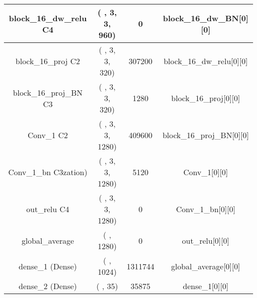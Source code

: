 \documentclass{bmvc2k}
\begin{document}
\begin{table}
\begin{tabular}{|c|c|c|c|}
block\_16\_dw\_relu C4  & ( , 3, 3, 960)  &  0      &     block\_16\_dw\_BN[0][0]      \\ \hline
block\_16\_proj C2       & ( , 3, 3, 320)  &  307200 &     block\_16\_dw\_relu[0][0]    \\ \hline
block\_16\_proj\_BN C3 & ( , 3, 3, 320)  &  1280   &     block\_16\_proj[0][0]           \\ \hline
Conv\_1 C2                 & ( , 3, 3, 1280) &  409600 &     block\_16\_proj\_BN[0][0]        \\ \hline
Conv\_1\_bn C3zation)  & ( , 3, 3, 1280) &  5120   &     Conv\_1[0][0]                     \\ \hline
out\_relu C4                 & ( , 3, 3, 1280) &  0      &     Conv\_1\_bn[0][0]                  \\ \hline
global\_average        & ( , 1280)       &  0      &     out\_relu[0][0]                   \\ \hline
dense\_1 (Dense)                 & ( , 1024)       &  1311744&     global\_average[0][0] \\ \hline
dense\_2 (Dense)                 & ( , 35)         &  35875  &     dense\_1[0][0]                    \\ \hline

\end{tabular}
\end{table}
\end{document}

